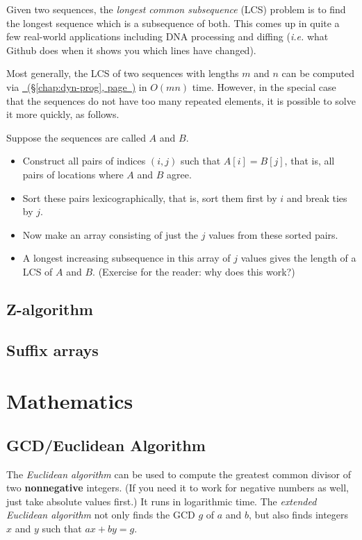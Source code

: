 \documentclass[10pt]{book}
\newcommand*{\fulllink}[1]{\hyperref[{#1}]{\nameref*{#1}~(\S\ref*{#1}, page~\pageref*{#1})}}
\begin{document}
Given two sequences, the \emph{longest common subsequence} (LCS)
problem is to find the longest sequence which is a subsequence of
both. This comes up in quite a few real-world applications including
DNA processing and diffing (\emph{i.e.} what Github does when it shows you
which lines have changed).

Most generally, the LCS of two sequences with lengths $m$ and $n$ can
be computed via \fulllink{chap:dyn-prog} in $O(mn)$ time.  However, in
the special case that the sequences do not have too many repeated
elements, it is possible to solve it more quickly, as follows.

Suppose the sequences are called $A$ and $B$.
\begin{itemize}
\item Construct all pairs of indices $(i,j)$ such that $A[i] = B[j]$,
  that is, all pairs of locations where $A$ and $B$ agree.
\item Sort these pairs lexicographically, that is, sort them first by
  $i$ and break ties by $j$.
\item Now make an array consisting of just the $j$ values from these
  sorted pairs.
\item A longest increasing subsequence in this array of $j$ values
  gives the length of a LCS of $A$ and $B$.  (Exercise for the reader:
  why does this work?)
\end{itemize}

\section{Z-algorithm}

\section{Suffix arrays}

\chapter{Mathematics}

\section{GCD/Euclidean Algorithm} \label{sec:euclid}

The \emph{Euclidean algorithm} can be used to compute the greatest
common divisor of two \textbf{nonnegative} integers. (If you need it
to work for negative numbers as well, just take absolute values
first.)  It runs in logarithmic time.  The \emph{extended Euclidean
  algorithm} not only finds the GCD $g$ of $a$ and $b$, but also finds
integers $x$ and $y$ such that $ax + by = g$.
\end{document}
